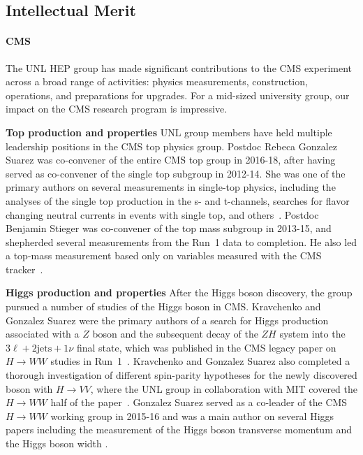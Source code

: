 \subsection{Intellectual Merit}

\paragraph{CMS}
The UNL HEP group has made significant contributions to the CMS experiment across a broad range of activities: physics measurements, construction, operations, and preparations for upgrades. 
For a mid-sized university group, our impact on the CMS research program is impressive.

{\bf Top production and properties} 
UNL group members have held multiple leadership positions in the CMS top
physics group.  Postdoc Rebeca Gonzalez Suarez was co-convener of the entire CMS top group
in 2016-18, after having 
served as co-convener of the single top
subgroup in 2012-14.  She was one of the primary authors on several
measurements in single-top physics, including the analyses of the single
top production in the s- and t-channels, searches for flavor changing
neutral currents in events with single top, and
others~\cite{bib:single-top-papers}.  Postdoc Benjamin Stieger was co-convener of the top
mass subgroup in 2013-15, and shepherded several measurements from the
Run~1 data to completion.  He also led a top-mass measurement based only on
variables measured with the CMS tracker~\cite{bib:tracker-top-mass}.

{\bf Higgs production and properties}
After the Higgs boson discovery, the group pursued a number of studies of the Higgs boson in CMS. Kravchenko and Gonzalez Suarez were the primary authors of a search for Higgs production associated with a $Z$ boson and the subsequent decay of the $ZH$ system into the $3\ell\!+\!2\text{jets}\!+\!1\nu$ final state,  which was published in the CMS legacy paper on $H\rightarrow WW$ studies in Run~1~\cite{bib:HWWlegacy}. Kravchenko and Gonzalez Suarez also completed a thorough investigation of different spin-parity hypotheses for the newly discovered boson with $H\rightarrow VV$, where the UNL group in collaboration with MIT covered the $H\rightarrow WW$ half of the paper~\cite{bib:higgs-spin-parity}. Gonzalez Suarez served as a co-leader of the CMS $H\to WW$ working group in 2015-16 and was a main author on several Higgs papers including the measurement of the Higgs boson transverse momentum \cite{bib:HWW-pT} and the Higgs boson width \cite{bib:Higgs-width}.

